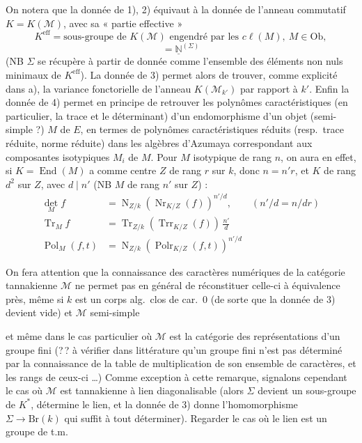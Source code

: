 \documentclass[11pt,a4paper]{article}
\begin{document}
On notera que la donnée de 1), 2) équivaut à la donnée de l'anneau commutatif
$K = K(\mathcal{M})$, avec sa « partie effective »
\[
K^{\mathrm{eff}} = \text{sous-groupe de } K(\mathcal{M})
\text{ engendré par les } c\ell(M),\ M \in \mathrm{Ob} ,
\]
\[
= \underline{\mathbb{N}}^{(\Sigma)}
\]
(NB $\Sigma$ se récupère à partir de   donnée
 comme l'ensemble des éléments non nuls
minimaux de $K^{\mathrm{eff}}$). La donnée de 3) permet alors de trouver,
comme explicité dans a), la variance fonctorielle de l'anneau
$K(\mathcal{M}_{k'})$ par rapport à $k'$. Enfin la donnée de 4) permet en
principe de retrouver les polynômes caractéristiques (en particulier, la
trace et le déterminant) d'un endomorphisme d'un objet \struck{\ill{}}
(semi-simple ?) $M$ de $E$, en termes de polynômes caractéristiques réduits
(resp.\ trace réduite, norme réduite) dans les algèbres d'Azumaya
 correspondant aux composantes isotypiques
$M_{i}$ de $M$. Pour $M$ isotypique de rang $n$, on aura en effet, si
$K = \operatorname{End}(M)$ a comme centre $Z$ de rang $r$ sur $k$, donc
$n = n'r$, et $K$ de rang $d^{2}$ sur $Z$, avec $d \mid n'$ (NB $M$ de rang
$n'$ sur $Z$) :
\begin{align*}
\operatorname{det}_{M} f &= \operatorname{N}_{Z/k}(\operatorname{Nr}_{K/Z}(f))^{n'/d} , \qquad (n'/d = n/dr) \\
\operatorname{Tr}_{M} f &= \operatorname{Tr}_{Z/k}(\operatorname{Trr}_{K/Z}(f))\, \frac{n'}{d} \\
\operatorname{Pol}_{M}(f,t) &= \operatorname{N}_{Z/k}(\operatorname{Polr}_{K/Z}(f,t))^{n'/d}
\end{align*}


On fera attention que la connaissance des caractères numériques de la
catégorie tannakienne $\mathcal{M}$ ne permet pas en général de réconstituer
celle-ci à équivalence près, même si $k$ est un corps alg.\ clos de car.\ $0$
(de sorte que la donnée de 3) devient vide) et $\mathcal{M}$ semi-simple

et  même dans le cas particulier où $\mathcal{M}$ est la
catégorie des représentations d'un groupe fini (?\,? à vérifier dans
littérature qu'un groupe fini n'est pas déterminé par la connaissance de la
table de multiplication de \struck{\ill{}} son ensemble de caractères, et les
rangs de ceux-ci …) Comme exception à cette remarque, signalons cependant
le cas où $\mathcal{M}$ est tannakienne à lien diagonalisable (alors $\Sigma$
devient un sous-groupe de $K^{*}$,   détermine le lien,
et la donnée de 3) donne l'homomorphisme
$\Sigma \to \mathrm{Br}(k)$ qui suffit à tout déterminer). Regarder le cas où
le lien est un groupe de t.m.
\end{document}
